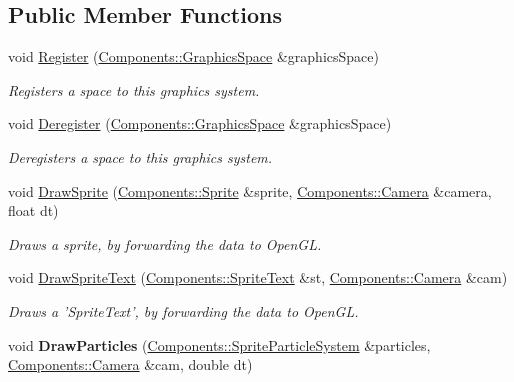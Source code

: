 \subsection*{Public Member Functions}
\begin{DoxyCompactItemize}
\item 
void \hyperlink{classDCEngine_1_1Systems_1_1Graphics_a1c558c475f1bc4f21c52dc4629ce0ffe}{Register} (\hyperlink{classDCEngine_1_1Components_1_1GraphicsSpace}{Components\-::\-Graphics\-Space} \&graphics\-Space)
\begin{DoxyCompactList}\small\item\em Registers a space to this graphics system. \end{DoxyCompactList}\item 
void \hyperlink{classDCEngine_1_1Systems_1_1Graphics_ad313edbeb05ac3b280122b3308566707}{Deregister} (\hyperlink{classDCEngine_1_1Components_1_1GraphicsSpace}{Components\-::\-Graphics\-Space} \&graphics\-Space)
\begin{DoxyCompactList}\small\item\em Deregisters a space to this graphics system. \end{DoxyCompactList}\item 
void \hyperlink{classDCEngine_1_1Systems_1_1Graphics_ac0d578967c3af52d251708fb2c3854da}{Draw\-Sprite} (\hyperlink{classDCEngine_1_1Components_1_1Sprite}{Components\-::\-Sprite} \&sprite, \hyperlink{classDCEngine_1_1Components_1_1Camera}{Components\-::\-Camera} \&camera, float dt)
\begin{DoxyCompactList}\small\item\em Draws a sprite, by forwarding the data to Open\-G\-L. \end{DoxyCompactList}\item 
void \hyperlink{classDCEngine_1_1Systems_1_1Graphics_a729adef1e9e7d3f461697d434c41956e}{Draw\-Sprite\-Text} (\hyperlink{classDCEngine_1_1Components_1_1SpriteText}{Components\-::\-Sprite\-Text} \&st, \hyperlink{classDCEngine_1_1Components_1_1Camera}{Components\-::\-Camera} \&cam)
\begin{DoxyCompactList}\small\item\em Draws a 'Sprite\-Text', by forwarding the data to Open\-G\-L. \end{DoxyCompactList}\item 
\hypertarget{classDCEngine_1_1Systems_1_1Graphics_aaf5567b5ab19d536074925b6820ccea2}{void {\bfseries Draw\-Particles} (\hyperlink{classDCEngine_1_1Components_1_1SpriteParticleSystem}{Components\-::\-Sprite\-Particle\-System} \&particles, \hyperlink{classDCEngine_1_1Components_1_1Camera}{Components\-::\-Camera} \&cam, double dt)}\label{classDCEngine_1_1Systems_1_1Graphics_aaf5567b5ab19d536074925b6820ccea2}


\end{DoxyCompactItemize}
